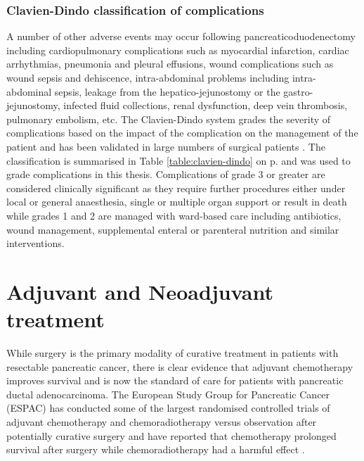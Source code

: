 \subsubsection{Clavien-Dindo classification of complications}

A number of other adverse events may occur following pancreaticoduodenectomy including cardiopulmonary complications such as myocardial infarction, cardiac arrhythmias, pneumonia and pleural effusions, wound complications such as wound sepsis and dehiscence, intra-abdominal problems including intra-abdominal sepsis, leakage from the hepatico-jejunostomy or the gastro-jejunostomy, infected fluid collections, renal dysfunction, deep vein thrombosis, pulmonary embolism, etc. 
The Clavien-Dindo system grades the severity of complications based on the impact of the complication on the management of the patient and has been validated in large numbers of surgical patients \parencite{clavien_clavien-dindo_2009, dindo_classification_2004}. 
The classification is summarised in Table \ref{table:clavien-dindo} on p\pageref{table:clavien-dindo}. 
and was used to grade complications in this thesis. 
Complications of grade 3 or greater are considered clinically significant as they require further procedures either under local or general anaesthesia, single or multiple organ support or result in death while grades 1 and 2 are managed with ward-based care including antibiotics, wound management, supplemental enteral or parenteral nutrition and similar interventions.

\section{Adjuvant and Neoadjuvant treatment}

While surgery is the primary modality of curative treatment in patients with resectable pancreatic cancer, there is clear evidence that adjuvant chemotherapy improves survival and is now the standard of care for patients with pancreatic ductal adenocarcinoma. 
The European Study Group for Pancreatic Cancer (ESPAC) has conducted some of the largest randomised controlled trials of adjuvant chemotherapy and chemoradiotherapy versus observation after potentially curative surgery and have reported that chemotherapy prolonged survival after surgery while chemoradiotherapy had a harmful effect \parencite{neoptolemos_adjuvant_2001, neoptolemos_randomized_2004, neoptolemos_adjuvant_2009, neoptolemos_adjuvant_2010}. 

